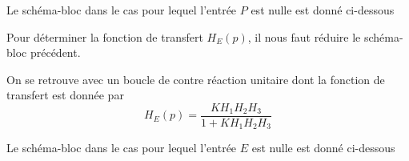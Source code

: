 
Le schéma-bloc dans le cas pour lequel l'entrée $P$ est nulle est donné 
ci-dessous
\begin{center}
    
\end{center}

Pour déterminer la fonction de transfert $H_E(p)$, il nous faut réduire le
schéma-bloc précédent.
\begin{center}
    
\end{center}
On se retrouve avec un boucle de contre réaction unitaire dont la fonction
de transfert est donnée par 
\[
    H_E(p)=\dfrac{KH_1H_2H_3}{1+KH_1H_2H_3}
\]

Le schéma-bloc dans le cas pour lequel l'entrée $E$ est nulle est donné 
ci-dessous
\begin{center}
    
\end{center}


